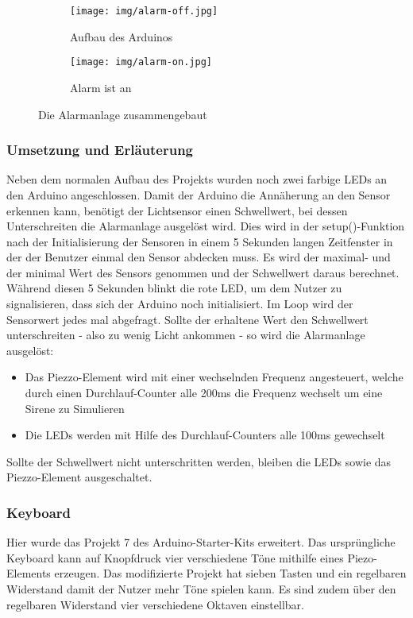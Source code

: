 \begin{figure}[h]
	\centering
	\begin{subfigure}[b]{0.48\linewidth}
		\centering
		\texttt{[image: img/alarm-off.jpg]}
		\caption{Aufbau des Arduinos}
	\end{subfigure}\enspace%
	\begin{subfigure}[b]{0.48\linewidth}
		\centering
		\texttt{[image: img/alarm-on.jpg]}
		\caption{Alarm ist an}
	\end{subfigure}
	\caption{Die Alarmanlage zusammengebaut}
\end{figure}

\subsubsection{Umsetzung und Erläuterung}
Neben dem normalen Aufbau des Projekts wurden noch zwei farbige LEDs an den Arduino angeschlossen.
Damit der Arduino die Annäherung an den Sensor erkennen kann, benötigt der Lichtsensor einen Schwellwert, bei dessen Unterschreiten die Alarmanlage ausgelöst wird. Dies wird in der setup()-Funktion nach der Initialisierung der Sensoren in einem 5 Sekunden langen Zeitfenster in der der Benutzer einmal den Sensor abdecken muss. Es wird der maximal- und der minimal Wert des Sensors genommen und der Schwellwert daraus berechnet. Während diesen 5 Sekunden blinkt die rote LED, um dem Nutzer zu signalisieren, dass sich der Arduino noch initialisiert.
Im Loop wird der Sensorwert jedes mal abgefragt. Sollte der erhaltene Wert den Schwellwert unterschreiten - also zu wenig Licht ankommen - so wird die Alarmanlage ausgelöst: 
\begin{itemize}
\item Das Piezzo-Element wird mit einer wechselnden Frequenz angesteuert, welche durch einen Durchlauf-Counter alle 200ms die Frequenz wechselt um eine Sirene zu Simulieren
\item Die LEDs werden mit Hilfe des Durchlauf-Counters alle 100ms gewechselt
\end{itemize}
Sollte der Schwellwert nicht unterschritten werden, bleiben die LEDs sowie das Piezzo-Element ausgeschaltet.

\subsubsection{Keyboard}
Hier wurde das Projekt 7 des Arduino-Starter-Kits erweitert. Das ursprüngliche Keyboard kann auf Knopfdruck vier verschiedene Töne mithilfe eines Piezo-Elements erzeugen. Das modifizierte Projekt hat sieben Tasten und ein regelbaren Widerstand
damit der Nutzer mehr Töne spielen kann. Es sind zudem über den regelbaren Widerstand vier verschiedene Oktaven einstellbar.


